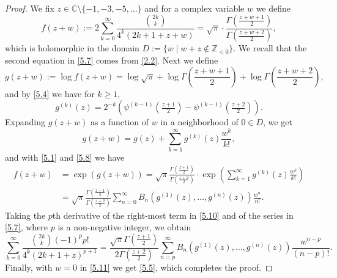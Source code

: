 \documentclass[10pt,a4paper]{amsart}
\begin{document}
\begin{proof}
We fix $z\in{\mathbb C}\setminus\{-1,-3,-5,\ldots\}$ and for a complex variable
$w$ we define
\begin{equation}\label{5.7}
f(z+w):=2\sum_{k=0}^\infty\frac{\binom{2k}{k}}{4^k(2k+1+z+w)}
=\sqrt{\pi}\cdot\frac{\Gamma(\frac{z+w+1}{2})}{\Gamma(\frac{z+w+2}{2})},
\end{equation}
which is holomorphic in the domain $D:=\{w\mid w+z\not\in{\mathbb Z}_{<0}\}$.
We recall that the second equation in \eqref{5.7} comes from \eqref{2.2}.
Next we define
\begin{equation}\label{5.8}
g(z+w):=\log f(z+w)=\log\sqrt{\pi}+\log\Gamma(\frac{z+w+1}{2})
+\log\Gamma(\frac{z+w+2}{2}),
\end{equation}
and by \eqref{5.4} we have for $k\geq 1$,
\begin{equation}\label{5.9}
g^{(k)}(z)
=2^{-k}\left(\psi^{(k-1)}(\tfrac{z+1}{2})-\psi^{(k-1)}(\tfrac{z+2}{2})\right).
\end{equation}
Expanding $g(z+w)$ as a function of $w$ in a neighborhood of $0\in D$, we get 
\[
g(z+w) = g(z)+\sum_{k=1}^\infty g^{(k)}(z)\frac{w^k}{k!},
\]
and with \eqref{5.1} and \eqref{5.8} we have
\begin{align}
f(z+w)&=\exp(g(z+w))
=\sqrt{\pi}\frac{\Gamma(\frac{z+1}{2})}{\Gamma(\frac{z+2}{2})}
\cdot\exp\left(\sum_{k=1}^\infty g^{(k)}(z)\frac{w^k}{k!}\right)\label{5.10}\\
&=\sqrt{\pi}\frac{\Gamma(\frac{z+1}{2})}{\Gamma(\frac{z+2}{2})}
\sum_{n=0}^\infty B_n(g^{(1)}(z),\ldots,g^{(n)}(z))\frac{w^n}{n!}.\nonumber
\end{align}
Taking the $p$th derivative of the right-most term in \eqref{5.10} and of the
series in \eqref{5.7}, where $p$ is a non-negative integer, we obtain
\begin{equation}\label{5.11}
\sum_{k=0}^\infty\frac{\binom{2k}{k}(-1)^p p!}{4^k(2k+1+z)^{p+1}}
=\frac{\sqrt{\pi}\Gamma(\frac{z+1}{2})}{2\Gamma(\frac{z+2}{2})}
\sum_{n=p}^\infty B_n(g^{(1)}(z),\ldots,g^{(n)}(z))\frac{w^{n-p}}{(n-p)!}.
\end{equation}
Finally, with $w=0$ in \eqref{5.11} we get \eqref{5.5}, which completes the
proof.
\end{proof}
\end{document}
